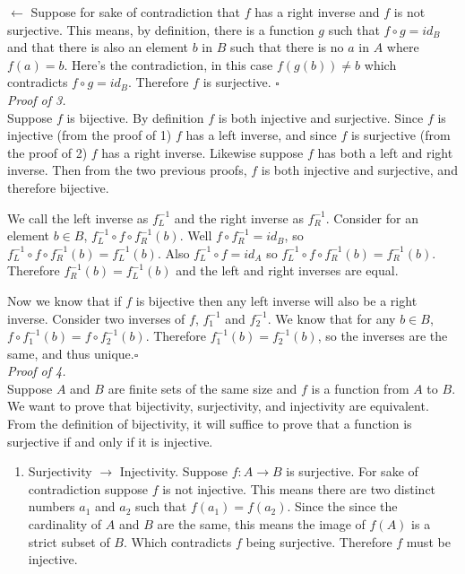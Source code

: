 \documentclass[12pt]{report}
\begin{document}
\begin{itemize}
$\leftarrow$ Suppose for sake of contradiction that $f$ has a right inverse and $f$ is not surjective. This means, by
             definition, there is a function $g$ such that $f \circ g = id_B$ and that there is also an element $b$ in
             $B$ such that there is no $a$ in $A$ where $f(a) = b$. Here's the contradiction, in this case
             $f(g(b)) \neq b$ which contradicts $f \circ g = id_B$. Therefore $f$ is surjective. $\square$\\

\textit{Proof of 3.}\\
Suppose $f$ is bijective. By definition $f$ is both injective and surjective. Since $f$ is injective (from the proof of
1) $f$ has a left inverse, and since $f$ is surjective (from the proof of 2) $f$ has a right inverse. Likewise suppose
$f$ has both a left and right inverse. Then from the two previous proofs, $f$ is both injective and surjective, and
therefore bijective.

We call the left inverse as $f^{-1}_L$ and the right inverse as $f^{-1}_R$. Consider for an element $b \in B$,
$f^{-1}_L \circ f \circ f^{-1}_R (b)$. Well $f\circ f^{-1}_R=id_B$, so $f^{-1}_L\circ f\circ f^{-1}_R (b)=f_L^{-1}(b).$
Also $f^{-1}_L \circ f = id_A$ so $f^{-1}_L \circ f \circ f^{-1}_R (b)=f_R^{-1}(b).$ Therefore $f_R^{-1}(b)=f_L^{-1}(b)$
and the left and right inverses are equal.

Now we know that if $f$ is bijective then any left inverse will also be a right inverse. Consider two inverses of $f$,
$f^{-1}_1$ and $f^{-1}_2$. We know that for any $b \in B$, $f\circ f_1^{-1}(b) = f\circ f_2^{-1}(b)$. Therefore
$f_1^{-1}(b) = f_2^{-1}(b)$, so the inverses are the same, and thus unique.$\square$\\

\textit{Proof of 4.}\\
Suppose $A$ and $B$ are finite sets of the same size and $f$ is a function from $A$ to $B$. We want to prove that
bijectivity, surjectivity, and injectivity are equivalent. From the definition of bijectivity, it will suffice to prove
that a function is surjective if and only if it is injective.

\begin{enumerate}
\item Surjectivity $\to$ Injectivity. Suppose $f:A \to B$ is surjective. For sake of contradiction suppose $f$ is not
      injective. This means there are two distinct numbers $a_1$ and $a_2$ such that $f(a_1) = f(a_2)$. Since the
      since the cardinality of $A$ and $B$ are the same, this means the image of $f(A)$ is a strict subset of $B$. Which
      contradicts $f$ being surjective. Therefore $f$ must be injective.


\end{enumerate}
\end{itemize}
\end{document}
